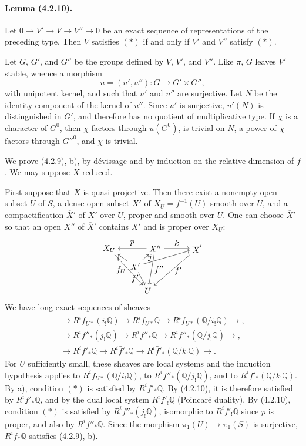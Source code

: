 \documentclass[10pt]{article}
\newcommand{\Q}{\mathbb Q}
\begin{document}
\paragraph{Lemma (4.2.10).} Let $0\to V'\to V\to V''\to0$ be an exact sequence of representations of the preceding type. Then $V$ satisfies $(*)$ if and only if $V'$ and $V''$ satisfy $(*)$.

Let $G$, $G'$, and $G''$ be the groups defined by $V$, $V'$, and $V''$. Like $\pi$, $G$ leaves $V'$ stable, whence a morphism
\[
u=(u',u''):G\longrightarrow G'\times G'',
\]
with unipotent kernel, and such that $u'$ and $u''$ are surjective. Let $N$ be the identity component of the kernel of $u''$. Since $u'$ is surjective, $u'(N)$ is distinguished in $G'$, and therefore has no quotient of multiplicative type. If $\chi$ is a character of $G^0$, then $\chi$ factors through $u(G^0)$, is trivial on $N$, a power of $\chi$ factors through $G''^0$, and $\chi$ is trivial.

We prove (4.2.9), b), by dévissage and by induction on the relative dimension of $f$. We may suppose $X$ reduced.

First suppose that $X$ is quasi-projective. Then there exist a nonempty open subset $U$ of $S$, a dense open subset $X'$ of $X_U=f^{-1}(U)$ smooth over $U$, and a compactification $\overline X'$ of $X'$ over $U$, proper and smooth over $U$. One can choose $\overline X'$ so that an open $X''$ of $\overline X'$ contains $X'$ and is proper over $X_U$:
\[
\begin{tikzpicture}[scale=.9,baseline=(current bounding box.center)]
\node (XU) at (0,2) {$X_U$};
\node (Xpp) at (2.2,2) {$X''$};
\node (Xbar) at (4.2,2) {$\overline X'$};
\node (Xp) at (1.25,1.15) {$X'$};
\node (U) at (1.85,0) {$U$};
\draw[->] (Xpp)--node[above] {$p$} (XU);
\draw[->] (Xpp)--node[above] {$k$} (Xbar);
\draw[->] (Xp)--node[left] {$i$} (XU);
\draw[->] (Xp)--node[right] {$j$} (Xpp);
\draw[->] (Xp)--(Xbar);
\draw[->] (XU)--node[left] {$f_U$} (U);
\draw[->] (Xp)--node[left] {$f'$} (U);
\draw[->] (Xpp)--node[right] {$f''$} (U);
\draw[->] (Xbar)--node[right] {$\bar f'$} (U);
\end{tikzpicture}
\]
We have long exact sequences of sheaves
\[
\begin{gathered}
\to R^if_{U*}(i_!\Q)\to R^if_{U*}\Q\to R^if_{U*}(\Q/i_!\Q)\to,\\
\to R^if''_*(j_!\Q)\to R^if''_*\Q\to R^if''_*(\Q/j_!\Q)\to,\\
\to R^if'_*\Q\to R^i\bar f'_*\Q\to R^i\bar f'_*(\Q/k_!\Q)\to .
\end{gathered}
\]
For $U$ sufficiently small, these sheaves are local systems and the induction hypothesis applies to $R^if_{U*}(\Q/i_!\Q)$, to $R^if''_*(\Q/j_!\Q)$, and to $R^i\bar f'_*(\Q/k_!\Q)$. By a), condition $(*)$ is satisfied by $R^i\bar f'_*\Q$. By (4.2.10), it is therefore satisfied by $R^if'_*\Q$, and by the dual local system $R^if'_!\Q$ (Poincaré duality). By (4.2.10), condition $(*)$ is satisfied by $R^if''_*(j_!\Q)$, isomorphic to $R^if'_!\Q$ since $p$ is proper, and also by $R^if''_*\Q$. Since the morphism $\pi_1(U)\to\pi_1(S)$ is surjective, $R^if_*\Q$ satisfies (4.2.9), b).
\end{document}
